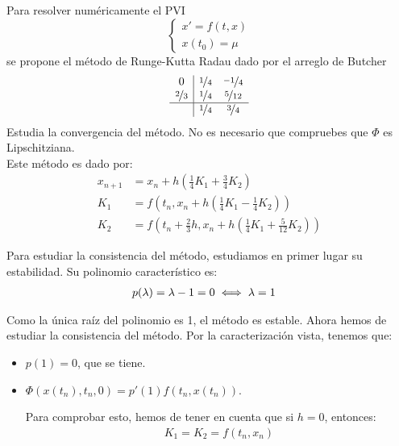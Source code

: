 \begin{ejercicio}[DGIIM 2023/24]
    Para resolver numéricamente el PVI
    \begin{equation*}
        \begin{cases}
            x' = f(t, x) \\
            x(t_0) = \mu
        \end{cases}
    \end{equation*}
    se propone el método de Runge-Kutta Radau dado por el arreglo de Butcher
    \begin{equation*}
        \begin{array}{c|ccc}
            0 & \nicefrac{1}{4} & \nicefrac{-1}{4} \\
            \nicefrac{2}{3} & \nicefrac{1}{4} & \nicefrac{5}{12} \\ \hline
            & \nicefrac{1}{4} & \nicefrac{3}{4} 
        \end{array}
    \end{equation*}
    Estudia la convergencia del método. No es necesario que compruebes que $\Phi$ es Lipschitziana.\\

    Este método es dado por:
    \begin{align*}
        x_{n+1} &= x_n + h\left(\frac{1}{4}K_1 + \frac{3}{4}K_2\right) \\
        K_1 &= f(t_n, x_n + h\left(\frac{1}{4}K_1 - \frac{1}{4}K_2\right)) \\
        K_2 &= f\left(t_n + \frac{2}{3}h, x_n + h\left(\frac{1}{4}K_1 + \frac{5}{12}K_2\right)\right)
    \end{align*}

    Para estudiar la consistencia del método, estudiamos en primer lugar su estabilidad. Su polinomio característico es:
    \begin{align*}
        p(\lambda) &= \lambda -1 = 0 \iff \lambda = 1
    \end{align*}

    Como la única raíz del polinomio es 1, el método es estable. Ahora hemos de estudiar la consistencia del método. Por la caracterización vista, tenemos que:
    \begin{itemize}
        \item $p(1)=0$, que se tiene.
        \item $\Phi(x(t_n), t_n, 0) = p'(1)f(t_n, x(t_n))$.
        
        Para comprobar esto, hemos de tener en cuenta que si $h=0$, entonces:
        \begin{align*}
            K_1 = K_2 = f(t_n, x_n)
        \end{align*}


\end{itemize}
\end{ejercicio}
